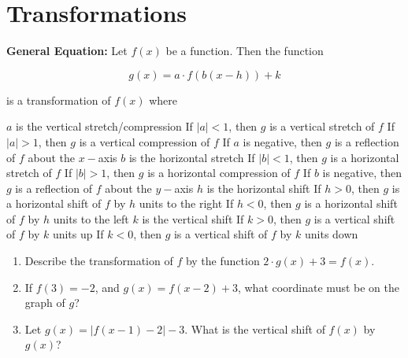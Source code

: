 \section{Transformations} 

\textbf{General Equation:} Let $f(x)$ be a function. Then the function

\[g(x)=a\cdot f(b(x-h))+k\]

is a transformation of $f(x)$ where

\begin{outline}
\1 $a$ is the vertical stretch/compression
\2 If $|a|<1$, then $g$ is a vertical stretch of $f$
\2 If $|a|>1$, then $g$ is a vertical compression of $f$
\2 If $a$ is negative, then $g$ is a reflection of $f$ about the $x-$axis
\1 $b$ is the horizontal stretch
\2 If $|b|<1$, then $g$ is a horizontal stretch of $f$
\2 If $|b|>1$, then $g$ is a horizontal compression of $f$
\2 If $b$ is negative, then $g$ is a reflection of $f$ about the $y-$axis
\1 $h$ is the horizontal shift
\2 If $h>0$, then $g$ is a horizontal shift of $f$ by $h$ units to the right
\2 If $h<0$, then $g$ is a horizontal shift of $f$ by $h$ units to the left
\1 $k$ is the vertical shift
\2 If $k>0$, then $g$ is a vertical shift of $f$ by $k$ units up
\2 If $k<0$, then $g$ is a vertical shift of $f$ by $k$ units down
\end{outline}

\vfill
\begin{enumerate}[labelindent=*,style=multiline,leftmargin=*,label=\textbf{Example \arabic*:}]
\item Describe the transformation of $f$ by the function $2\cdot g(x)+3=f(x)$.
\vfill\item If $f(3)=-2$, and $g(x)=f(x-2)+3$, what coordinate must be on the graph of $g$?
\vfill\item Let $g(x)=|f(x-1)-2|-3$. What is the vertical shift of $f(x)$ by $g(x)$?
\end{enumerate}

